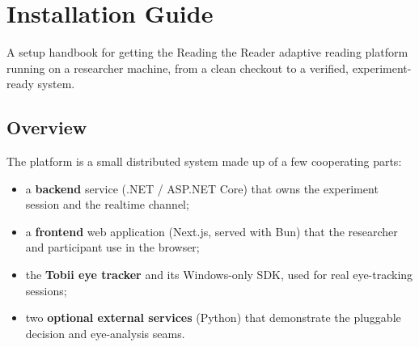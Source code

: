 \providecommand{\tightlist}{\setlength{\itemsep}{0pt}\setlength{\parskip}{0pt}}
\makeatletter{}\makeatother %
\providecommand{\guidescreenshotpending}[1]{\fbox{\parbox[c][3cm][c]{0.9\linewidth}{\centering\itshape Screenshot pending: place the image file at \texttt{#1}.}}}
\captionsetup{list=no}

\chapter{Installation Guide}\label{app:installation-guide}

A setup handbook for getting the Reading the Reader adaptive reading platform running on a
researcher machine, from a clean checkout to a verified, experiment-ready system.

\FloatBarrier
\section{Overview}\label{1-overview}

The platform is a small distributed system made up of a few cooperating parts:

\begin{itemize}
\tightlist
\item
  a \textbf{backend} service (.NET / ASP.NET Core) that owns the experiment session and the realtime
  channel;
\item
  a \textbf{frontend} web application (Next.js, served with Bun) that the researcher and participant
  use in the browser;
\item
  the \textbf{Tobii eye tracker} and its Windows-only SDK, used for real eye-tracking sessions;
\item
  two \textbf{optional external services} (Python) that demonstrate the pluggable decision and
  eye-analysis seams.
\end{itemize}


